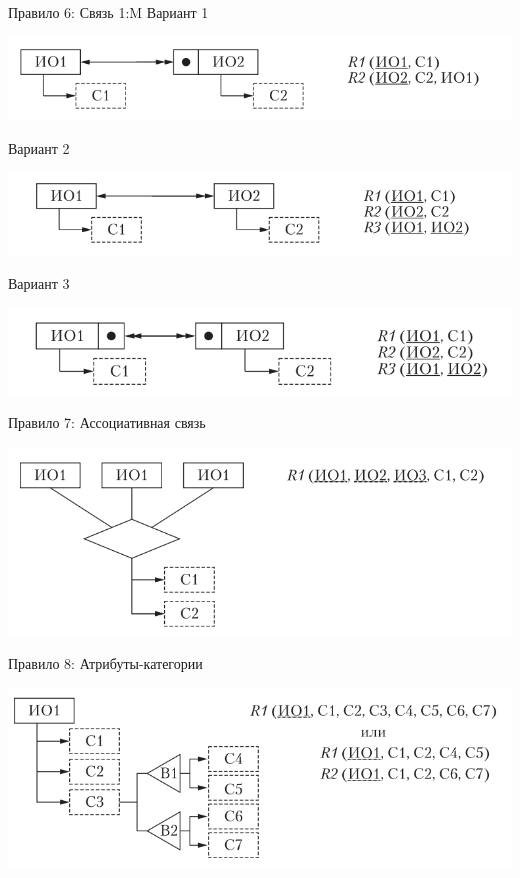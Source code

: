 \documentclass{beamer}
\begin{document}
\begin{frame}{Правило 6: Связь 1:M}
Вариант 1
\begin{center}
\includegraphics[scale=0.5]{images/lec03-pic19.png}
\end{center}
Вариант 2
\begin{center}
\includegraphics[scale=0.5]{images/lec03-pic20.png}
\end{center}
Вариант 3
\begin{center}
\includegraphics[scale=0.5]{images/lec03-pic21.png}
\end{center}
\end{frame}

\begin{frame}{Правило 7: Ассоциативная связь}
\begin{center}
\includegraphics[scale=0.75]{images/lec03-pic22.png}
\end{center}
\end{frame}

\begin{frame}{Правило 8: Атрибуты-категории}
\begin{center}
\includegraphics[scale=0.6]{images/lec03-pic23.png}
\end{center}
\end{frame}
\end{document}
